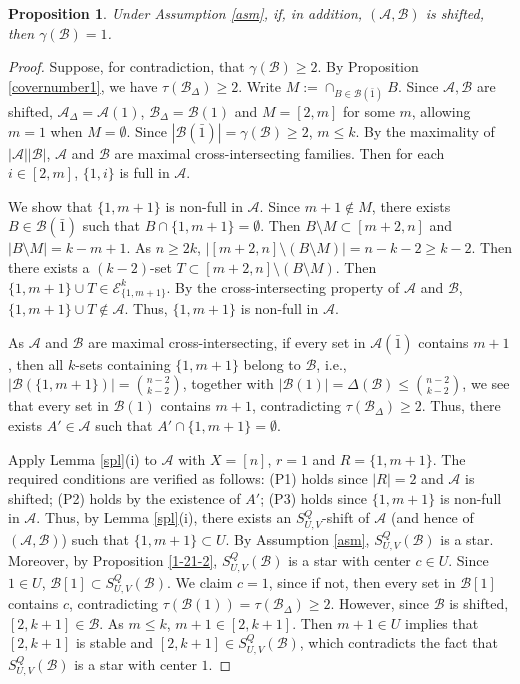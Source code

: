 \documentclass[a4paper,11pt]{article}
\newtheorem{proposition}[theorem]{Proposition}
\newcommand{\m}{\mathcal}
\begin{document}
\begin{proposition}\label{covernumber2-shifted}
Under Assumption \ref{asm}, if, in addition,  $(\mathcal A,\mathcal B)$ is shifted, then $\gamma(\m B)=1$.
\end{proposition}
\begin{proof}
Suppose, for contradiction, that $\gamma(\m B)\ge 2$. 
By Proposition \ref{covernumber1}, we have $\tau(\m B_{\Delta})\ge 2$. 
Write $M:=\cap_{B\in \m B(\bar{1})}B.$ 
Since $\m A, \m B$ are shifted, $\m A_{\Delta}=\m A(1)$, $\m B_{\Delta}=\m B(1)$ and $M=[2,m]$ for some $m$, allowing $m=1$ when $M=\emptyset$. Since $|\m B(\bar1)|=\gamma(\m B)\ge 2$, $m\le k$.
By the maximality of $|\m A||\m B|$, $\m A$ and $\m B$ are maximal cross-intersecting families.
Then for each $i\in [2,m]$, $\{1,i\}$ is full in $\m A$. 

We show that $\{1,m+1\}$ is non-full in $\m A$. 
Since $m+1\not\in M$, there exists $B\in \m B(\bar1)$ such that $B\cap \{1,m+1\}=\emptyset$. 
Then $B\setminus M \subset [m+2,n]$ and $|B\setminus M|=k-m+1$.
As $n\ge 2k$, $|[m+2,n]\setminus (B\setminus M) |=n-k-2\ge k-2$. 
Then there exists a $(k-2)$-set $T \subset [m+2,n]\setminus (B\setminus M)$. 
Then $\{1,m+1\}\cup T \in \mathcal E^k_{\{1,m+1\}}$. 
By the cross-intersecting property of $\m A$ and $\m B$, $\{1,m+1\}\cup T \not\in \m A$. 
Thus, $\{1,m+1\}$ is non-full in $\m A$.  


As $\m A$ and $\m B$ are maximal cross-intersecting, if every set in $\m A(\bar 1)$ contains $m+1$, then all $k$-sets containing $\{1,m+1\}$ belong to $\m B$, i.e., $|\m B(\{1,m+1\})|={n-2\choose k-2}$, together with $|\m B(1)|=\Delta(\m B)\le {n-2\choose k-2}$, we see that every set in $\m B(1)$ contains $m+1$, contradicting $\tau(\m B_{\Delta})\ge 2$. 
Thus, there exists $A'\in \m A$ such that $A'\cap \{1,m+1\}=\emptyset$.

Apply Lemma \ref{spl}(i) to $\m A$ with $X=[n]$, $r=1$ and $R=\{1, m+1\}$.
The required conditions are verified as follows: (P1) holds since $|R|=2$ and $\m A$ is shifted; (P2) holds by the existence of $A'$; (P3) holds since  $\{1,m+1\}$ is non-full in $\m A$. 
Thus, by Lemma \ref{spl}(i),
there exists an $S_{U,V}^Q$-shift of $\m A$ (and hence of $(\m A, \m B)$) such that $\{1,m+1\}\subset U$. 
By Assumption \ref{asm},  $S_{U,V}^Q(\m B)$ is a star. Moreover, by Proposition \ref{1-21-2}, $S_{U,V}^Q(\m B)$ is a star with center $c\in U$. Since $1\in U$, $\m B[1]\subset S_{U,V}^Q(\m B)$.
We claim $c=1$, since if not, then every set in $\m B[1]$ contains $c$, contradicting $\tau(\m B(1))=\tau(\m B_{\Delta})\ge 2$. 
However, since $\m B$ is shifted, $[2,k+1]\in \m B$. 
As $m\le k$, $m+1\in [2,k+1]$. Then $m+1\in U$ implies that $[2,k+1]$ is stable and $[2,k+1]\in S_{U,V}^Q(\m B)$, which contradicts the fact that $S_{U,V}^Q(\m B)$ is a star with center $1$.
\end{proof}
\end{document}

